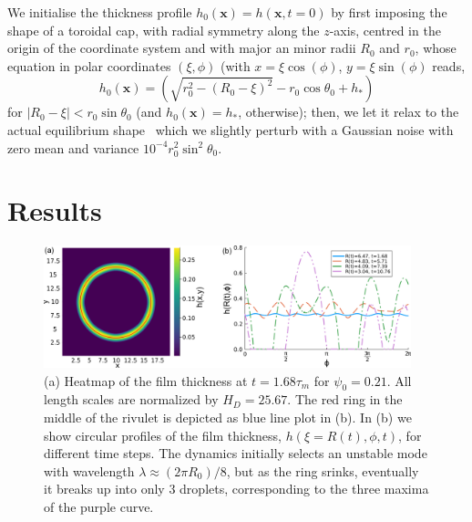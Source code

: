 \documentclass[twoside,twocolumn,9pt]{article}
\begin{document}
We initialise the thickness profile $h_0(\mathbf{x})=h(\mathbf{x}, t=0)$ by first imposing the shape of a toroidal cap, with radial symmetry along the $z$-axis, centred in the origin of the coordinate system
and with major an minor radii $R_0$ and $r_0$,
whose equation in polar coordinates $(\xi, \phi)$ (with $x = \xi \cos(\phi)$, $y=\xi \sin(\phi)$ reads,
\begin{equation}\label{eq:torus}
h_0(\mathbf{x})=\left(\sqrt{r_0^2 - \left(R_0-\xi\right)^2} - r_0\cos \theta_0 + h_{\ast}\right)
\end{equation}
for $|R_0-\xi|<r_0 \sin \theta_0$ (and $h_0(\mathbf{x})=h_{\ast}$, otherwise); then, we let it relax to the actual 
equilibrium shape~\cite{diezBreakupFluidRivulets2009} which we slightly perturb with a Gaussian noise with zero mean and variance $10^{-4}r_0^2 \sin^2\theta_0$. 

\section{Results}
\label{sec:dynamics}
\begin{figure}
    \centering
    \includegraphics[width=0.95\textwidth]{assets/heatcirc_2.png}
    \caption{(a) Heatmap of the film thickness at $t=1.68\tau_m$ for $\psi_0 = 0.21$. 
    All length scales are normalized by $H_D = 25.67$. 
    The red ring in the middle of the rivulet is depicted as blue line plot in (b).
    In (b) we show circular profiles of the film thickness, $h(\xi=R(t),\phi,t)$, for different time steps.
    The dynamics initially selects an unstable mode with wavelength $\lambda \approx (2 \pi R_0)/8$, 
    but as the ring srinks, eventually it breaks up into only $3$ droplets, corresponding to the three maxima of the purple curve.}
    \label{fig:ThreeDToOneD}
\end{figure}
\end{document}
